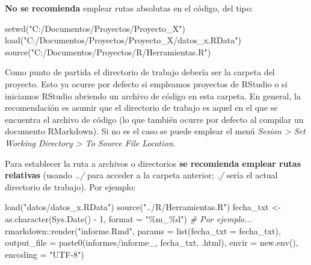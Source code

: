 \documentclass[
]{book}
\newenvironment{Shaded}{\begin{snugshade}}{\end{snugshade}}
\newcommand{\AttributeTok}[1]{\textcolor[rgb]{0.77,0.63,0.00}{#1}}
\newcommand{\CommentTok}[1]{\textcolor[rgb]{0.56,0.35,0.01}{\textit{#1}}}
\newcommand{\DecValTok}[1]{\textcolor[rgb]{0.00,0.00,0.81}{#1}}
\newcommand{\FunctionTok}[1]{\textcolor[rgb]{0.00,0.00,0.00}{#1}}
\newcommand{\NormalTok}[1]{#1}
\newcommand{\OtherTok}[1]{\textcolor[rgb]{0.56,0.35,0.01}{#1}}
\newcommand{\SpecialCharTok}[1]{\textcolor[rgb]{0.00,0.00,0.00}{#1}}
\newcommand{\StringTok}[1]{\textcolor[rgb]{0.31,0.60,0.02}{#1}}
\theoremstyle{break}
\theoremstyle{nonumberplain}
\begin{document}
\textbf{No se recomienda} emplear rutas absolutas en el código, del tipo:

\begin{Shaded}
\begin{Highlighting}[]
\FunctionTok{setwd}\NormalTok{(}\StringTok{"C:/Documentos/Proyectos/Proyecto\_X"}\NormalTok{)}
\FunctionTok{load}\NormalTok{(}\StringTok{"C:/Documentos/Proyectos/Proyecto\_X/datos\_x.RData"}\NormalTok{)}
\FunctionTok{source}\NormalTok{(}\StringTok{"C:/Documentos/Proyectos/R/Herramientas.R"}\NormalTok{)}
\end{Highlighting}
\end{Shaded}

Como punto de partida el directorio de trabajo debería ser la carpeta del proyecto.
Esto ya ocurre por defecto si empleamos proyectos de RStudio o si iniciamos RStudio abriendo un archivo de código en esta carpeta.
En general, la recomendación es asumir que el directorio de trabajo es aquel en el que se encuentra el archivo de código (lo que también ocurre por defecto al compilar un documento RMarkdown).
Si no es el caso se puede emplear el menú \emph{Sesion \textgreater{} Set Working Directory \textgreater{} To Source File Location}.

Para establecer la ruta a archivos o directorios \textbf{se recomienda emplear rutas relativas} (usando \emph{../} para acceder a la carpeta anterior; \emph{./} sería el actual directorio de trabajo).
Por ejemplo:

\begin{Shaded}
\begin{Highlighting}[]
\FunctionTok{load}\NormalTok{(}\StringTok{"datos/datos\_x.RData"}\NormalTok{)}
\FunctionTok{source}\NormalTok{(}\StringTok{"../R/Herramientas.R"}\NormalTok{)}
\NormalTok{fecha\_txt }\OtherTok{\textless{}{-}} \FunctionTok{as.character}\NormalTok{(}\FunctionTok{Sys.Date}\NormalTok{() }\SpecialCharTok{{-}} \DecValTok{1}\NormalTok{, }\AttributeTok{format =} \StringTok{"\%m\_\%d"}\NormalTok{) }\CommentTok{\# Por ejemplo...}
\NormalTok{rmarkdown}\SpecialCharTok{::}\FunctionTok{render}\NormalTok{(}\StringTok{"informe.Rmd"}\NormalTok{, }\AttributeTok{params =} \FunctionTok{list}\NormalTok{(}\AttributeTok{fecha\_txt =}\NormalTok{ fecha\_txt),}
                  \AttributeTok{output\_file =} \FunctionTok{paste0}\NormalTok{(}\StringTok{\textquotesingle{}informes/informe\_\textquotesingle{}}\NormalTok{, fecha\_txt, }\StringTok{\textquotesingle{}.html\textquotesingle{}}\NormalTok{), }
                  \AttributeTok{envir =} \FunctionTok{new.env}\NormalTok{(), }\AttributeTok{encoding =} \StringTok{"UTF{-}8"}\NormalTok{)}
\end{Highlighting}
\end{Shaded}
\end{document}
